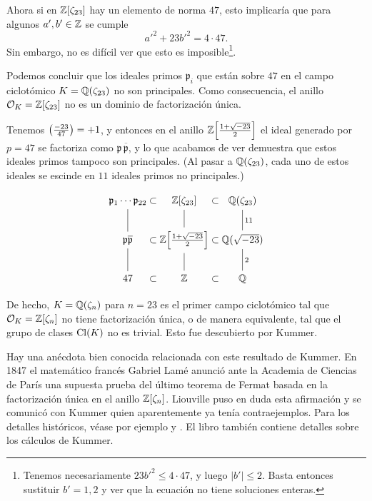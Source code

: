 \begin{ejemplo}[Kummer]
  Ahora si en $\mathbb{Z} [\zeta_{23}]$ hay un elemento de norma $47$, esto implicaría
  que para algunos $a',b' \in \mathbb{Z}$ se cumple
  $$a'^2 + 23b'^2 = 4\cdot 47.$$
  Sin embargo, no es difícil ver que esto es imposible\footnote{Tenemos
    necesariamente $23 b'^2 \le 4\cdot 47$, y luego $|b'| \le 2$. Basta
    entonces sustituir $b' = 1,2$ y ver que la ecuación no tiene soluciones
    enteras.}.

  Podemos concluir que los ideales primos $\mathfrak{p}_i$ que están sobre $47$
  en el campo ciclotómico $K = \mathbb{Q} (\zeta_{23})$ no son principales. Como
  consecuencia, el anillo $\mathcal{O}_K = \mathbb{Z} [\zeta_{23}]$ no es un dominio de
  factorización única.

  Tenemos $\left(\frac{-23}{47}\right) = +1$, y entonces en el anillo
  $\mathbb{Z} \Bigl[\frac{1 + \sqrt{-23}}{2}\Bigr]$ el ideal generado por $p = 47$
  se factoriza como $\mathfrak{p}\,\overline{\mathfrak{p}}$, y lo que acabamos
  de ver demuestra que estos ideales primos tampoco son principales.
  (Al pasar a $\mathbb{Q} (\zeta_{23})$, cada uno de estos ideales se escinde en $11$
  ideales primos no principales.)

  \[ \begin{tikzcd}
    \mathfrak{p}_1 \cdots \mathfrak{p}_{22} \ar[-]{d} &[-3em] \subset &[-3em] \ZZ [\zeta_{23}]\ar[-]{d} &[-3em] \subset &[-3em] \QQ (\zeta_{23}) \ar[-]{d}{11} \\
    \mathfrak{p} \overline{\mathfrak{p}} \ar[-]{d} & \subset & \ZZ \Bigl[\frac{1 + \sqrt{-23}}{2}\Bigr]\ar[-]{d} & \subset & \QQ (\sqrt{-23}) \ar[-]{d}{2} \\
    47 & \subset & \ZZ & \subset & \QQ
    \end{tikzcd} \]
\end{ejemplo}

De hecho, $K = \mathbb{Q} (\zeta_n)$ para $n = 23$ es el primer campo ciclotómico
tal que $\mathcal{O}_K = \mathbb{Z} [\zeta_n]$ no tiene factorización única, o de manera
equivalente, tal que el grupo de clases $\operatorname{Cl} (K)$ no es trivial. Esto fue
descubierto por Kummer.

Hay una anécdota bien conocida relacionada con este resultado de Kummer.
En 1847 el matemático francés Gabriel Lamé anunció ante la Academia de Ciencias
de París una supuesta prueba del último teorema de Fermat basada en
la factorización única en el anillo $\mathbb{Z} [\zeta_n]$. Liouville puso en duda esta
afirmación y se comunicó con Kummer quien aparentemente ya tenía
contraejemplos. Para los detalles históricos, véase por ejemplo
\cite{Edwards-1975} y \cite{Edwards-1977}. El libro \cite{Edwards-1996}
también contiene detalles sobre los cálculos de Kummer.

